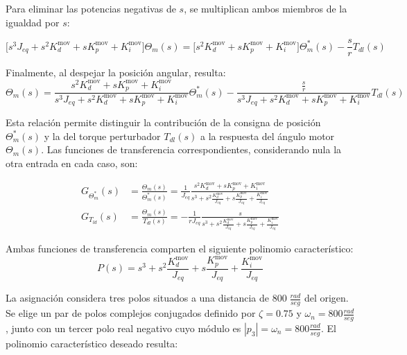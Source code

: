\documentclass[blue,fullpaper]{ludusofficial}  %
\begin{document}
Para eliminar las potencias negativas de $s$, se multiplican ambos miembros de la igualdad por $s$:

\[
\Big[ s^{3}J_{eq} + s^{2}K_{d}^{\text{mov}} + sK_{p}^{\text{mov}}  + K_{i}^{\text{mov}} \Big] \Theta_{m}(s) = \Big[  s^{2}K_{d}^{\text{mov}} + sK_{p}^{\text{mov}} + K_{i}^{\text{mov}} \Big] \Theta^{*}_{m}(s) - \frac{s}{r} T_{dl}(s) 
\]

Finalmente, al despejar la posición angular, resulta:
\begin{equation}
\label{eq:respuesta-posicion-lc}
\Theta_{m}(s) = \frac{  s^{2}K_{d}^{\text{mov}} + sK_{p}^{\text{mov}} + K_{i}^{\text{mov}} }{ s^{3}J_{eq} + s^{2}K_{d}^{\text{mov}} + sK_{p}^{\text{mov}}  + K_{i}^{\text{mov}} } \Theta^{*}_{m}(s) - \frac{\frac{s}{r}}{ s^{3}J_{eq} + s^{2}K_{d}^{\text{mov}} + sK_{p}^{\text{mov}}  + K_{i}^{\text{mov}} } T_{dl}(s) 
\end{equation}

Esta relación permite distinguir la contribución de la consigna de posición $\Theta_{m}^{*}(s)$ y la del torque perturbador $T_{dl}(s)$ a la respuesta del ángulo motor $\Theta_{m}(s)$. Las funciones de transferencia correspondientes, considerando nula la otra entrada en cada caso, son:

\begin{align}
G_{\Theta^{*}_{m}}(s) & = \frac{\Theta_{m}(s)}{\Theta^{*}_{m}(s) }  = \frac{1}{J_{eq}} \frac{  s^{2}K_{d}^{\text{mov}} + sK_{p}^{\text{mov}} + K_{i}^{\text{mov}} }{ s^{3}+ s^{2}\frac{K_{d}^{\text{mov}}}{J_{eq}} + s\frac{K_{p}^{\text{mov}}}{J_{eq}}  + \frac{K_{i}^{\text{mov}}}{J_{eq}} }
\label{eq:transferencia-posicion-lc} \\
G_{T_{ld}}(s) & = \frac{\Theta_{m}(s)}{T_{dl}(s) } =  - \frac{1}{rJ_{eq}} \frac{s}{ s^{3}+ s^{2}\frac{K_{d}^{\text{mov}}}{J_{eq}} + s\frac{K_{p}^{\text{mov}}}{J_{eq}}  + \frac{K_{i}^{\text{mov}}}{J_{eq}} }
\label{eq:transferencia-perturbacion-lc}
\end{align}

Ambas funciones de transferencia comparten el siguiente polinomio característico:
\begin{equation}
\label{eq:polinomio-movimiento}
P(s) = s^{3}+ s^{2}\frac{K_{d}^{\text{mov}}}{J_{eq}} + s\frac{K_{p}^{\text{mov}}}{J_{eq}}  + \frac{K_{i}^{\text{mov}}}{J_{eq}}
\end{equation}

La asignación considera tres polos situados a una distancia de $800\;\frac{rad}{seg}$ del origen. Se elige un par de polos complejos conjugados definido por $\zeta=0.75$ y $\omega_{n}=800 \frac{rad}{seg}$, junto con un tercer polo real negativo cuyo módulo es $|p_{3}|=\omega_{n}=800 \frac{rad}{seg}$. El polinomio característico deseado resulta:
\end{document}
